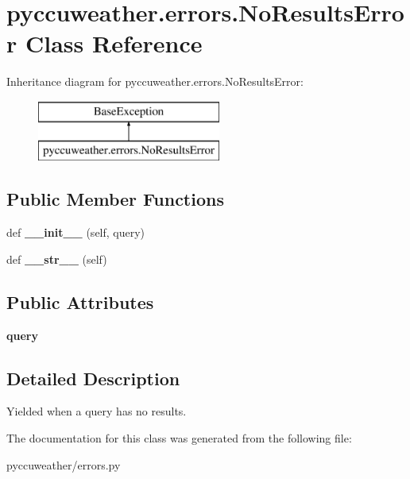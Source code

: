 \hypertarget{classpyccuweather_1_1errors_1_1_no_results_error}{}\section{pyccuweather.\+errors.\+No\+Results\+Error Class Reference}
\label{classpyccuweather_1_1errors_1_1_no_results_error}
Inheritance diagram for pyccuweather.\+errors.\+No\+Results\+Error\+:\begin{figure}[H]
\begin{center}
\leavevmode
\includegraphics[height=2.000000cm]{classpyccuweather_1_1errors_1_1_no_results_error}
\end{center}
\end{figure}
\subsection*{Public Member Functions}
\begin{DoxyCompactItemize}
\item 
\hypertarget{classpyccuweather_1_1errors_1_1_no_results_error_ab671979f5d4914e2b20f942161b1d1fc}{}def {\bfseries \+\_\+\+\_\+init\+\_\+\+\_\+} (self, query)\label{classpyccuweather_1_1errors_1_1_no_results_error_ab671979f5d4914e2b20f942161b1d1fc}

\item 
\hypertarget{classpyccuweather_1_1errors_1_1_no_results_error_addf01ff5fb6de6e7adbea60c3591b5a0}{}def {\bfseries \+\_\+\+\_\+str\+\_\+\+\_\+} (self)\label{classpyccuweather_1_1errors_1_1_no_results_error_addf01ff5fb6de6e7adbea60c3591b5a0}

\end{DoxyCompactItemize}
\subsection*{Public Attributes}
\begin{DoxyCompactItemize}
\item 
\hypertarget{classpyccuweather_1_1errors_1_1_no_results_error_a97d7016ae414702e5ce3b28e69ae48ed}{}{\bfseries query}\label{classpyccuweather_1_1errors_1_1_no_results_error_a97d7016ae414702e5ce3b28e69ae48ed}

\end{DoxyCompactItemize}


\subsection{Detailed Description}
\begin{DoxyVerb}Yielded when a query has no results.
\end{DoxyVerb}
 

The documentation for this class was generated from the following file\+:\begin{DoxyCompactItemize}
\item 
pyccuweather/errors.\+py\end{DoxyCompactItemize}
